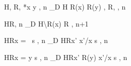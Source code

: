 \begin{figure}[p]
\begin{minipage}{\textwidth}



 { \langle H, R, *x
  \leftarrow y , n \rangle \longrightarrow_{D} \langle H \Lfc R(x)
  \rightarrow R(y) \Rfc , R, \SKIP , n \rangle }

     {\langle
      H\coma R\coma \FREE , n \rangle \xlongrightarrow{\Free}_{D}
      \langle H\backslash \Lfc R(x) \Rfc \coma R \coma \SKIP , n+1
      \rangle }

{\langle H\coma R\coma  \LET x = \NULL \ \IN s , n \rangle
  \longrightarrow_{D}
  \langle H\coma R\Lfc x' \rightarrow \NULL \Rfc \coma   \Lb x'/x \Rb s , n  \rangle }

{\langle H\coma R\coma \LET x = y \; \IN s , n \rangle
  \longrightarrow_{D}
  \langle H\coma R\Lfc x' \rightarrow R(y) \Rfc \coma   \Lb x'/x \Rb s , n  \rangle }


\end{minipage}
\end{figure}
